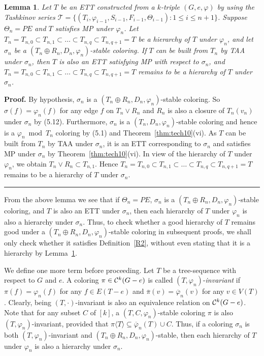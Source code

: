 \documentclass[11pt]{article}
\newtheorem{lemma}[theorem]{Lemma}
\newcommand{\TT}{\mathcal {T}}
\newcommand{\phiv}{\varphi}
\def\qed{\hfill \rule{4pt}{7pt}}
\begin{document}
\begin{lemma}\label{splitter}
Let $T$ be an ETT constructed from a $k$-triple $(G,e, \varphi)$ by using the Tashkinov series 
$\TT=\{(T_i, \phiv_{i-1}, S_{i-1}, F_{i-1}, \Theta_{i-1}): 1\le i \le n+1\}$. Suppose $\Theta_n=PE$ and
$T$ satisfies MP under $\varphi_n$. Let $T_n=T_{n,0}\subset T_{n,1} \subset 	\ldots \subset T_{n,q}\subset T_{n,q+1}=T$ be a 
hierarchy of $T$ under $\varphi_n$, and let $\sigma_n$ be a $(T_n \oplus R_n, D_n,\varphi_n)$-stable coloring. If $T$ can be built from 
$T_n$ by TAA under $\sigma_n$, then $T$ is also an ETT satisfying MP with respect to $\sigma_n$, 
and $T_n=T_{n,0} \subset T_{n,1}\subset \ldots \subset T_{n,q}\subset T_{n,q+1}=T$ remains to be a hierarchy of $T$ 
under $\sigma_n$.
\end{lemma}

{\bf Proof.}  By hypothesis, $\sigma_n$ is a $(T_n \oplus R_n, D_n,\varphi_n)$-stable coloring. So $\sigma(f)=\varphi_n(f)$ for any edge $f$ 
on $T_n \vee R_n$ and $R_n$ is also a closure of $T_n(v_n)$ under $\sigma_n$ by (5.12). Furthermore, $\sigma_n$ is a $(T_n,D_n,\varphi_n)$-stable 
coloring and hence is a $\phiv_n\bmod T_n$ coloring by (5.1) and Theorem~\ref{thm:tech10}(vi).  As $T$ can be built from $T_n$ by TAA under $\sigma_n$,
it is an ETT corresponding to $\sigma_n$ and satisfies MP under $\sigma_n$ by Theorem~\ref{thm:tech10}(vi). In view of the hierarchy of $T$ under 
$\varphi_n$, we obtain $T_n\vee R_n\subset T_{n,1}$. Hence $T_n=T_{n,0} \subset T_{n,1}\subset \ldots \subset T_{n,q}\subset T_{n,q+1}=T$ 
remains to be a hierarchy of $T$ under $\sigma_n$.  \qed

\vskip 2mm
From the above lemma we see that if $\Theta_n=PE$, $\sigma_n$ is a $(T_n \oplus R_n, D_n,\varphi_n)$-stable coloring, 
and $T$ is also an ETT under $\sigma_n$, then each hierarchy of $T$ under $\varphi_n$ is also a hierarchy under $\sigma_n$. Thus, 
to check whether a good hierarchy of $T$ remains good under a $(T_n \oplus R_n, D_n,\varphi_n)$-stable coloring in subsequent proofs, 
we shall only check whether it satisfies Definition~\ref{R2}, without even stating that it is a hierarchy by Lemma~\ref{splitter}.

We define one more term before proceeding. Let $T$ be a tree-sequence with respect to $G$ and $e$. A coloring 
$\pi \in {\cal C}^k(G-e)$ is called $(T, \varphi_n)$-{\em invariant}\label{tinvariant} 
if $\pi(f) = \varphi_n(f)$ for any $f\in E(T-e)$ and $\overline{\pi} (v) = \overline{\varphi}_n(v)$ for any $v\in V(T)$. 
Clearly, being $(T, \cdot)$-invariant is also an equivalence relation on ${\cal C}^k(G-e)$. Note that for any subset 
$C$ of $[k]$, a $(T, C, \varphi_n)$-stable coloring $\pi$ is also $(T, \varphi_n)$-invariant, provided that ${\pi}\langle 
T \rangle \subseteq \overline{\varphi}_n(T)\cup C$. Thus, if a coloring $\sigma_n$ is both $(T, \varphi_n)$-invariant and 
$(T_n \oplus R_n, D_n,\varphi_n)$-stable, then each hierarchy of $T$ under $\varphi_n$ is also a hierarchy under $\sigma_n$.
\end{document}
